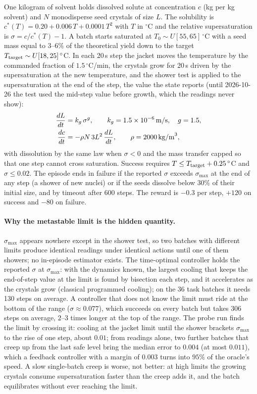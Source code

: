 \documentclass[11pt,a4paper]{article}
\begin{document}
One kilogram of solvent holds dissolved solute at concentration $c$ (kg per kg solvent) and $N$ monodisperse seed crystals of size $L$. The solubility is $c^*(T)=0.20+0.006\,T+0.0001\,T^2$ with $T$ in $^\circ$C and the relative supersaturation is $\sigma=c/c^*(T)-1$. A batch starts saturated at $T_0\sim U[55,65]\,^\circ$C with a seed mass equal to $3$--$6\%$ of the theoretical yield down to the target $T_{\rm target}\sim U[18,25]\,^\circ$C. In each 20\,s step the jacket moves the temperature by the commanded fraction of $1.5\,^\circ$C/min, the crystals grow for 20\,s driven by the supersaturation at the new temperature, and the shower test is applied to the supersaturation at the end of the step, the value the state reports (until 2026-10-26 the test used the mid-step value before growth, which the readings never show):
\begin{align}
\frac{dL}{dt} &= k_g\,\sigma^{g}, \qquad k_g=1.5\times10^{-6}\,\text{m/s},\quad g=1.5, \notag\\
\frac{dc}{dt} &= -\rho N\,3L^2\,\frac{dL}{dt}, \qquad \rho=2000\,\text{kg/m}^3,
\end{align}
with dissolution by the same law when $\sigma<0$ and the mass transfer capped so that one step cannot cross saturation. Success requires $T\le T_{\rm target}+0.25\,^\circ$C and $\sigma\le0.02$. The episode ends in failure if the reported $\sigma$ exceeds $\sigma_{\max}$ at the end of any step (a shower of new nuclei) or if the seeds dissolve below $30\%$ of their initial size, and by timeout after 600 steps. The reward is $-0.3$ per step, $+120$ on success and $-80$ on failure.

\paragraph{Why the metastable limit is the hidden quantity.}
$\sigma_{\max}$ appears nowhere except in the shower test, so two batches with different limits produce identical readings under identical actions until one of them showers; no in-episode estimator exists. The time-optimal controller holds the reported $\sigma$ at $\sigma_{\max}$: with the dynamics known, the largest cooling that keeps the end-of-step value at the limit is found by bisection each step, and it accelerates as the crystals grow (classical programmed cooling); on the 36 task batches it needs 130 steps on average. A controller that does not know the limit must ride at the bottom of the range ($\sigma\approx0.077$), which succeeds on every batch but takes 306 steps on average, $2$--$3$ times longer at the top of the range. The probe run finds the limit by crossing it: cooling at the jacket limit until the shower brackets $\sigma_{\max}$ to the rise of one step, about $0.01$; from readings alone, two further batches that creep up from the last safe level bring the median error to $0.004$ (at most $0.011$), which a feedback controller with a margin of $0.003$ turns into $95\%$ of the oracle's speed. A slow single-batch creep is worse, not better: at high limits the growing crystals consume supersaturation faster than the creep adds it, and the batch equilibrates without ever reaching the limit.
\end{document}
